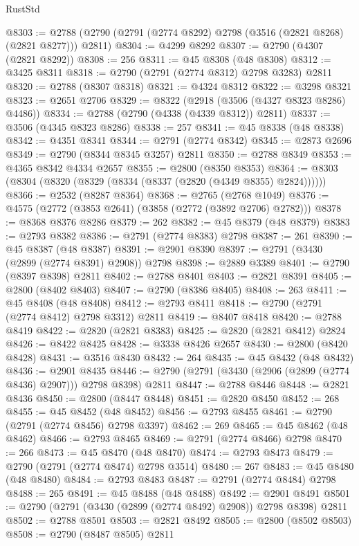 \begin{lexlean}{RustStd}
\begin{coremodule}
@8303 := @2788 (@2790 (@2791 (@2774 @8292) @2798 (@3516 (@2821 @8268) (@2821 @8277))) @2811)
@8304 := @4299 @8292
@8307 := @2790 (@4307 (@2821 @8292))
@8308 := 256
@8311 := @45 @8308 (@48 @8308)
@8312 := @3425 @8311
@8318 := @2790 (@2791 (@2774 @8312) @2798 @3283) @2811
@8320 := @2788 (@8307 @8318)
@8321 := @4324 @8312
@8322 := @3298 @8321
@8323 := @2651 @2706
@8329 := @8322 (@2918 (@3506 (@4327 @8323 @8286) @4486))
@8334 := @2788 (@2790 (@4338 (@4339 @8312)) @2811)
@8337 := @3506 (@4345 @8323 @8286)
@8338 := 257
@8341 := @45 @8338 (@48 @8338)
@8342 := @4351 @8341
@8344 := @2791 (@2774 @8342)
@8345 := @2873 @2696
@8349 := @2790 (@8344 @8345 @3257) @2811
@8350 := @2788 @8349
@8353 := @4365 @8342 @4334 @2657
@8355 := @2800 (@8350 @8353)
@8364 := @8303 (@8304 (@8320 (@8329 (@8334 (@8337 (@2820 (@4349 @8355) @2824))))))
@8366 := @2532 (@8287 @8364)
@8368 := @2765 (@2768 @1049)
@8376 := @4575 (@2772 (@3853 @2641) (@3858 (@2772 (@3892 @2706) @2782)))
@8378 := @8368 @8376 @8286
@8379 := 262
@8382 := @45 @8379 (@48 @8379)
@8383 := @2793 @8382
@8386 := @2791 (@2774 @8383) @2798
@8387 := 261
@8390 := @45 @8387 (@48 @8387)
@8391 := @2901 @8390
@8397 := @2791 (@3430 (@2899 (@2774 @8391) @2908)) @2798
@8398 := @2889 @3389
@8401 := @2790 (@8397 @8398) @2811
@8402 := @2788 @8401
@8403 := @2821 @8391
@8405 := @2800 (@8402 @8403)
@8407 := @2790 (@8386 @8405)
@8408 := 263
@8411 := @45 @8408 (@48 @8408)
@8412 := @2793 @8411
@8418 := @2790 (@2791 (@2774 @8412) @2798 @3312) @2811
@8419 := @8407 @8418
@8420 := @2788 @8419
@8422 := @2820 (@2821 @8383)
@8425 := @2820 (@2821 @8412) @2824
@8426 := @8422 @8425
@8428 := @3338 @8426 @2657
@8430 := @2800 (@8420 @8428)
@8431 := @3516 @8430
@8432 := 264
@8435 := @45 @8432 (@48 @8432)
@8436 := @2901 @8435
@8446 := @2790 (@2791 (@3430 (@2906 (@2899 (@2774 @8436) @2907))) @2798 @8398) @2811
@8447 := @2788 @8446
@8448 := @2821 @8436
@8450 := @2800 (@8447 @8448)
@8451 := @2820 @8450
@8452 := 268
@8455 := @45 @8452 (@48 @8452)
@8456 := @2793 @8455
@8461 := @2790 (@2791 (@2774 @8456) @2798 @3397)
@8462 := 269
@8465 := @45 @8462 (@48 @8462)
@8466 := @2793 @8465
@8469 := @2791 (@2774 @8466) @2798
@8470 := 266
@8473 := @45 @8470 (@48 @8470)
@8474 := @2793 @8473
@8479 := @2790 (@2791 (@2774 @8474) @2798 @3514)
@8480 := 267
@8483 := @45 @8480 (@48 @8480)
@8484 := @2793 @8483
@8487 := @2791 (@2774 @8484) @2798
@8488 := 265
@8491 := @45 @8488 (@48 @8488)
@8492 := @2901 @8491
@8501 := @2790 (@2791 (@3430 (@2899 (@2774 @8492) @2908)) @2798 @8398) @2811
@8502 := @2788 @8501
@8503 := @2821 @8492
@8505 := @2800 (@8502 @8503)
@8508 := @2790 (@8487 @8505) @2811

\end{coremodule}
\end{lexlean}

